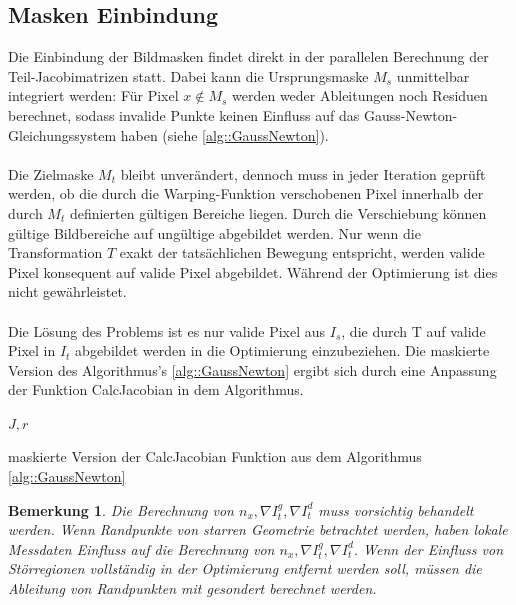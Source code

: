 \documentclass[12pt,DIV=15,BCOR=15mm,twoside,headsepline,abstract=true,listof=totoc,bibliography=totoc]{scrreprt}
\newtheorem{remark}{Bemerkung}[chapter]
\theoremstyle{remark}    %
\begin{document}
    \subsection{Masken Einbindung}
    Die Einbindung der Bildmasken findet direkt in der parallelen Berechnung der Teil-Jacobimatrizen statt. 
    Dabei kann die Ursprungsmaske $M_s$ unmittelbar integriert werden: Für Pixel $x \notin M_s$ werden weder Ableitungen noch Residuen berechnet, sodass invalide Punkte 
    keinen Einfluss auf das Gauss-Newton-Gleichungssystem haben (siehe \ref{alg::GaussNewton}).\\\\
    Die Zielmaske $M_t$ bleibt unverändert, dennoch muss in jeder Iteration geprüft werden, ob die durch die Warping-Funktion verschobenen Pixel innerhalb der 
    durch $M_t$ definierten gültigen Bereiche liegen.
    Durch die Verschiebung können gültige Bildbereiche auf ungültige abgebildet werden. Nur wenn die Transformation $T$ exakt der tatsächlichen Bewegung entspricht,
    werden valide Pixel konsequent auf valide Pixel abgebildet. Während der Optimierung ist dies nicht gewährleistet.\\\\
    Die Lösung des Problems ist es nur valide Pixel aus $I_s$, die durch T auf valide Pixel in $I_t$ abgebildet werden in die Optimierung einzubeziehen. 
    Die maskierte Version des Algorithmus's \ref{alg::GaussNewton} ergibt sich durch eine Anpassung der Funktion \glqq CalcJacobian \grqq in dem Algorithmus.
    \begin{algorithm}[h]
        
        \Return $J, r$\;
        \caption{maskierte Version der CalcJacobian Funktion aus dem Algorithmus \ref{alg::GaussNewton}}

    \end{algorithm}
    
    \begin{remark}
    Die Berechnung von $n_x,\nabla I_t^g, \nabla I_t^d$ muss vorsichtig behandelt werden. Wenn Randpunkte von starren Geometrie 
    betrachtet werden, haben lokale Messdaten Einfluss auf die Berechnung von $n_x,\nabla I_t^g, \nabla I_t^d$. Wenn der Einfluss von Störregionen
    vollständig in der Optimierung entfernt werden soll, müssen die Ableitung von Randpunkten mit gesondert berechnet werden.
    \end{remark}
\end{document}

